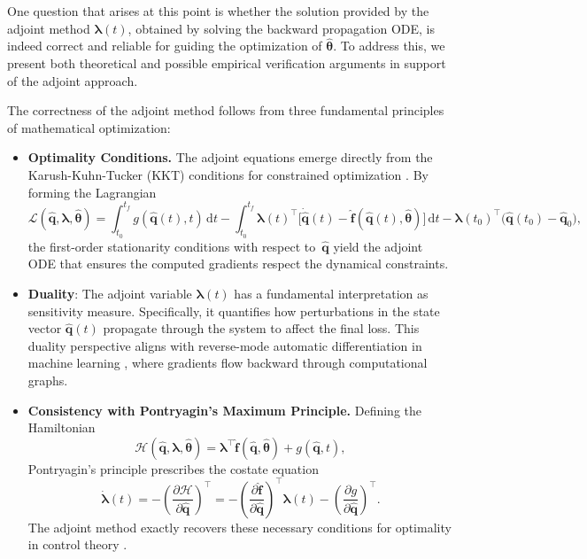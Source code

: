 One question that arises at this point is whether the solution provided by the adjoint method $\bm{\lambda}(t)$, obtained by solving the backward propagation ODE, is indeed correct and reliable for guiding the optimization of $\hat{\bm{\theta}}$. To address this, we present both theoretical and possible empirical verification arguments in support of the adjoint approach.

The correctness of the adjoint method follows from three fundamental principles of mathematical optimization:

\begin{itemize}
    \item \textbf{Optimality Conditions.}  The adjoint equations emerge directly from the Karush-Kuhn-Tucker (KKT) conditions for constrained optimization \cite{nocedal1999numerical}. By forming the Lagrangian\\
    $$\mathscr{L}(\hat{\mathbf{q}}, \bm{\lambda}, \hat{\bm{\theta}}) 
    = \int_{t_0}^{t_f} g(\hat{\mathbf{q}}(t),t) \,\mathrm{d}t
      - \int_{t_0}^{t_f} \bm{\lambda}(t)^\top \bigl[\dot{\hat{\mathbf{q}}}(t)-\hat{\mathbf{f}}(\hat{\mathbf{q}}(t),\hat{\bm{\theta}})\bigr]\,\mathrm{d}t
      - \bm{\lambda}(t_0)^\top \bigl(\hat{\mathbf{q}}(t_0)-\hat{\mathbf{q}}_0\bigr) ,$$
  the first-order stationarity conditions with respect to~$\hat{\mathbf{q}}$ yield the adjoint ODE that ensures the computed gradients respect the dynamical constraints.
    
    \item \textbf{Duality}: The adjoint variable $\bm{\lambda}(t)$ has a fundamental interpretation as sensitivity measure. Specifically, it quantifies how perturbations in the state vector $\hat{\mathbf{q}}(t)$ propagate through the system to affect the final loss. This duality perspective aligns with reverse-mode automatic differentiation in machine learning \cite{chen2018neural}, where gradients flow backward through computational graphs.

    \item \textbf{Consistency with Pontryagin's Maximum Principle.}  Defining the Hamiltonian\\
  $$\mathcal{H}(\hat{\mathbf{q}}, \bm{\lambda}, \hat{\bm{\theta}}) 
      = \bm{\lambda}^\top \hat{\mathbf{f}}(\hat{\mathbf{q}}, \hat{\bm{\theta}}) 
      + g(\hat{\mathbf{q}}, t),$$
  Pontryagin's principle prescribes the costate equation\\
  $$\dot{\bm{\lambda}}(t) 
      = - \left(\frac{\partial \mathcal{H}}{\partial \hat{\mathbf{q}}} \right)^{\top}
      = - \left(\frac{\partial \hat{\mathbf{f}}}{\partial \hat{\mathbf{q}}} \right)^{\top}\bm{\lambda}(t) -  \left(\frac{\partial g}{\partial \hat{\mathbf{q}}} \right)^{\top}.$$
  The adjoint method exactly recovers these necessary conditions for optimality in control theory \cite{liberzon2011calculus}.
\end{itemize}


